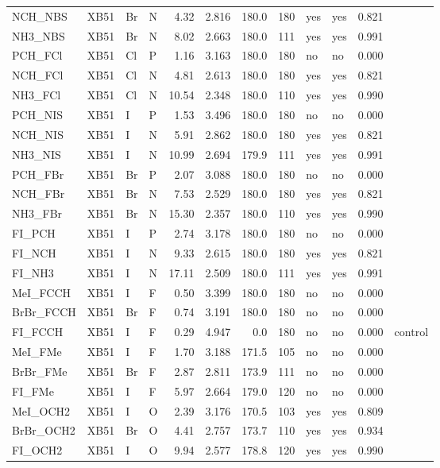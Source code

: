 {\begin{longtable}{llllrrrrllrl}
NCH\_NBS & XB51 & Br & N & 4.32 & 2.816 & 180.0 & 180 & yes & yes & 0.821 & \\
NH3\_NBS & XB51 & Br & N & 8.02 & 2.663 & 180.0 & 111 & yes & yes & 0.991 & \\
PCH\_FCl & XB51 & Cl & P & 1.16 & 3.163 & 180.0 & 180 & no & no & 0.000 & \\
NCH\_FCl & XB51 & Cl & N & 4.81 & 2.613 & 180.0 & 180 & yes & yes & 0.821 & \\
NH3\_FCl & XB51 & Cl & N & 10.54 & 2.348 & 180.0 & 110 & yes & yes & 0.990 & \\
PCH\_NIS & XB51 & I & P & 1.53 & 3.496 & 180.0 & 180 & no & no & 0.000 & \\
NCH\_NIS & XB51 & I & N & 5.91 & 2.862 & 180.0 & 180 & yes & yes & 0.821 & \\
NH3\_NIS & XB51 & I & N & 10.99 & 2.694 & 179.9 & 111 & yes & yes & 0.991 & \\
PCH\_FBr & XB51 & Br & P & 2.07 & 3.088 & 180.0 & 180 & no & no & 0.000 & \\
NCH\_FBr & XB51 & Br & N & 7.53 & 2.529 & 180.0 & 180 & yes & yes & 0.821 & \\
NH3\_FBr & XB51 & Br & N & 15.30 & 2.357 & 180.0 & 110 & yes & yes & 0.990 & \\
FI\_PCH & XB51 & I & P & 2.74 & 3.178 & 180.0 & 180 & no & no & 0.000 & \\
FI\_NCH & XB51 & I & N & 9.33 & 2.615 & 180.0 & 180 & yes & yes & 0.821 & \\
FI\_NH3 & XB51 & I & N & 17.11 & 2.509 & 180.0 & 111 & yes & yes & 0.991 & \\
MeI\_FCCH & XB51 & I & F & 0.50 & 3.399 & 180.0 & 180 & no & no & 0.000 & \\
BrBr\_FCCH & XB51 & Br & F & 0.74 & 3.191 & 180.0 & 180 & no & no & 0.000 & \\
FI\_FCCH & XB51 & I & F & 0.29 & 4.947 & 0.0 & 180 & no & no & 0.000 & control\\
MeI\_FMe & XB51 & I & F & 1.70 & 3.188 & 171.5 & 105 & no & no & 0.000 & \\
BrBr\_FMe & XB51 & Br & F & 2.87 & 2.811 & 173.9 & 111 & no & no & 0.000 & \\
FI\_FMe & XB51 & I & F & 5.97 & 2.664 & 179.0 & 120 & no & no & 0.000 & \\
MeI\_OCH2 & XB51 & I & O & 2.39 & 3.176 & 170.5 & 103 & yes & yes & 0.809 & \\
BrBr\_OCH2 & XB51 & Br & O & 4.41 & 2.757 & 173.7 & 110 & yes & yes & 0.934 & \\
FI\_OCH2 & XB51 & I & O & 9.94 & 2.577 & 178.8 & 120 & yes & yes & 0.990 & \\

\end{longtable}}
